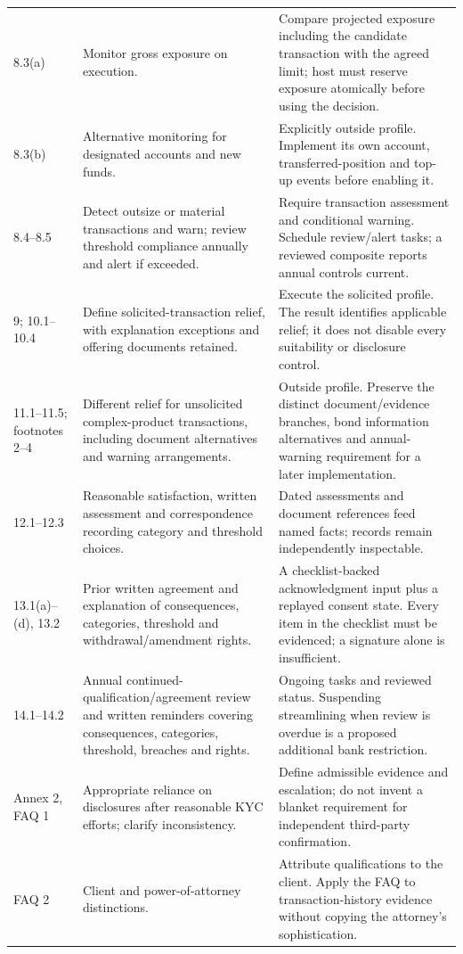 \documentclass[12pt,a4paper,oneside,openany]{book}
\begin{document}
\begin{longtable}{P{0.14\textwidth}P{0.37\textwidth}P{0.39\textwidth}}
8.3(a) & Monitor gross exposure on execution. & Compare projected exposure including the candidate transaction with the agreed limit; host must reserve exposure atomically before using the decision.\\
8.3(b) & Alternative monitoring for designated accounts and new funds. & Explicitly outside profile. Implement its own account, transferred-position and top-up events before enabling it.\\
8.4--8.5 & Detect outsize or material transactions and warn; review threshold compliance annually and alert if exceeded. & Require transaction assessment and conditional warning. Schedule review/alert tasks; a reviewed composite reports annual controls current.\\
9; 10.1--10.4 & Define solicited-transaction relief, with explanation exceptions and offering documents retained. & Execute the solicited profile. The result identifies applicable relief; it does not disable every suitability or disclosure control.\\
11.1--11.5; footnotes 2--4 & Different relief for unsolicited complex-product transactions, including document alternatives and warning arrangements. & Outside profile. Preserve the distinct document/evidence branches, bond information alternatives and annual-warning requirement for a later implementation.\\
12.1--12.3 & Reasonable satisfaction, written assessment and correspondence recording category and threshold choices. & Dated assessments and document references feed named facts; records remain independently inspectable.\\
13.1(a)--(d), 13.2 & Prior written agreement and explanation of consequences, categories, threshold and withdrawal/amendment rights. & A checklist-backed acknowledgment input plus a replayed consent state. Every item in the checklist must be evidenced; a signature alone is insufficient.\\
14.1--14.2 & Annual continued-qualification/agreement review and written reminders covering consequences, categories, threshold, breaches and rights. & Ongoing tasks and reviewed status. Suspending streamlining when review is overdue is a proposed additional bank restriction.\\
Annex 2, FAQ 1 & Appropriate reliance on disclosures after reasonable KYC efforts; clarify inconsistency. & Define admissible evidence and escalation; do not invent a blanket requirement for independent third-party confirmation.\\
FAQ 2 & Client and power-of-attorney distinctions. & Attribute qualifications to the client. Apply the FAQ to transaction-history evidence without copying the attorney's sophistication.\\

\end{longtable}
\end{document}
